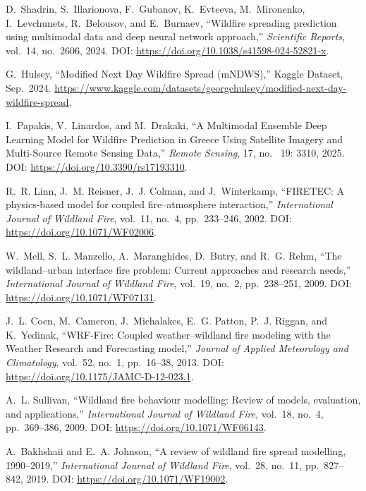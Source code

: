 \documentclass[conference]{IEEEtran}
\begin{document}
\begin{thebibliography}{00}
D.~Shadrin, S.~Illarionova, F.~Gubanov, K.~Evteeva, M.~Mironenko, I.~Levchunets, R.~Belousov, and E.~Burnaev, ``Wildfire spreading prediction using multimodal data and deep neural network approach,'' \emph{Scientific Reports}, vol.~14, no.~2606, 2024. DOI: \url{https://doi.org/10.1038/s41598-024-52821-x}.

G.~Hulsey, ``Modified Next Day Wildfire Spread (mNDWS),'' Kaggle Dataset, Sep.~2024. \url{https://www.kaggle.com/datasets/georgehulsey/modified-next-day-wildfire-spread}.

I.~Papakis, V.~Linardos, and M.~Drakaki, ``A Multimodal Ensemble Deep Learning Model for Wildfire Prediction in Greece Using Satellite Imagery and Multi-Source Remote Sensing Data,''
\emph{Remote Sensing}, 17, no.~ 19: 3310,  2025. DOI: \url{https://doi.org/10.3390/rs17193310}.

R.~R. Linn, J.~M. Reisner, J.~J. Colman, and J.~Winterkamp,
``FIRETEC: A physics-based model for coupled fire--atmosphere interaction,''
\emph{International Journal of Wildland Fire}, vol.~11, no.~4, pp.~233--246, 2002. DOI: \url{https://doi.org/10.1071/WF02006}.

W.~Mell, S.~L. Manzello, A.~Maranghides, D.~Butry, and R.~G. Rehm,
``The wildland--urban interface fire problem: Current approaches and research needs,''
\emph{International Journal of Wildland Fire}, vol.~19, no.~2, pp.~238--251, 2009. DOI: \url{https://doi.org/10.1071/WF07131}.

J.~L. Coen, M.~Cameron, J.~Michalakes, E.~G. Patton, P.~J. Riggan, and K.~Yedinak,
``WRF-Fire: Coupled weather--wildland fire modeling with the Weather Research and Forecasting model,''
\emph{Journal of Applied Meteorology and Climatology}, vol.~52, no.~1, pp.~16--38, 2013. DOI: \url{https://doi.org/10.1175/JAMC-D-12-023.1}.

A.~L. Sullivan,
``Wildland fire behaviour modelling: Review of models, evaluation, and applications,''
\emph{International Journal of Wildland Fire}, vol.~18, no.~4, pp.~369--386, 2009. DOI: \url{https://doi.org/10.1071/WF06143}.

A.~Bakhshaii and E.~A. Johnson,
``A review of wildland fire spread modelling, 1990--2019,''
\emph{International Journal of Wildland Fire}, vol.~28, no.~11, pp.~827--842, 2019. DOI: \url{https://doi.org/10.1071/WF19002}.


\end{thebibliography}
\end{document}
